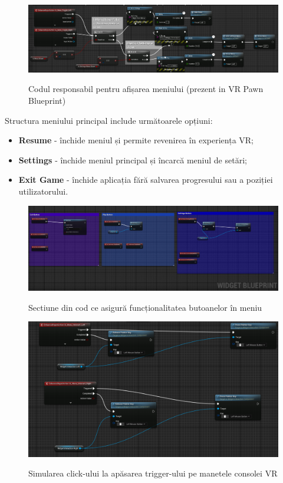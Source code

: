 \begin{figure} [htp] 
\centering 
\includegraphics [width=14cm]
{continut/capitol3/figuri/Main_show.png} 
\label{fig:Menu} 
    \caption{Codul responsabil pentru afișarea meniului (prezent in VR Pawn Blueprint)}
\end{figure}
\newpage
Structura meniului principal include următoarele opțiuni:
\begin{itemize}
    \item \textbf{Resume} - închide meniul și permite revenirea în experiența VR;
    \item \textbf{Settings} - închide meniul principal și încarcă meniul de setări;
    \item \textbf{Exit Game} - închide aplicația fără salvarea progresului sau a poziției utilizatorului.
\end{itemize}

\begin{figure} [htp] 
\centering 
\includegraphics [width=14cm]
{continut/capitol3/figuri/Main_menu_graph.png} 
\label{fig:Menu} 
    \caption{Sectiune din cod ce asigură funcționalitatea butoanelor în meniu}
\end{figure}

\begin{figure} [htp] 
\centering 
\includegraphics [width=14cm]
{continut/capitol3/figuri/ClickSim.png} 
\label{fig:Menu}  
    \caption{Simularea click-ului la apăsarea trigger-ului pe manetele consolei VR}
\end{figure}

